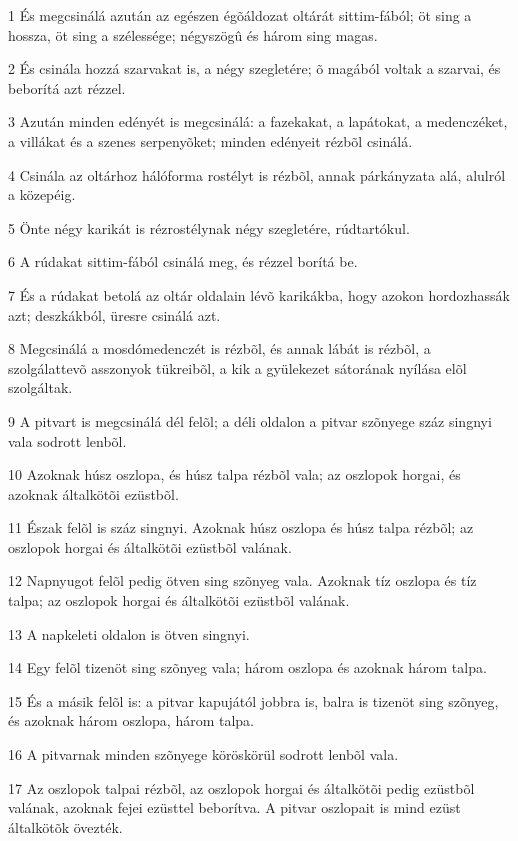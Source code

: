 \par 1 És megcsinálá azután az egészen égõáldozat oltárát sittim-fából; öt sing a hossza, öt sing a szélessége; négyszögû és három sing magas.
\par 2 És csinála hozzá szarvakat is, a négy szegletére; õ magából voltak a szarvai, és beborítá azt rézzel.
\par 3 Azután minden edényét is megcsinálá: a fazekakat, a lapátokat, a medenczéket, a villákat és a szenes serpenyõket; minden edényeit rézbõl csinálá.
\par 4 Csinála az oltárhoz hálóforma rostélyt is rézbõl, annak párkányzata alá, alulról a közepéig.
\par 5 Önte négy karikát is rézrostélynak négy szegletére, rúdtartókul.
\par 6 A rúdakat sittim-fából csinálá meg, és rézzel borítá be.
\par 7 És a rúdakat betolá az oltár oldalain lévõ karikákba, hogy azokon hordozhassák azt; deszkákból, üresre csinálá azt.
\par 8 Megcsinálá a mosdómedenczét is rézbõl, és annak lábát is rézbõl, a szolgálattevõ asszonyok tükreibõl, a kik a gyülekezet sátorának nyílása elõl szolgáltak.
\par 9 A pitvart is megcsinálá dél felõl; a déli oldalon a pitvar szõnyege száz singnyi vala sodrott lenbõl.
\par 10 Azoknak húsz oszlopa, és húsz talpa rézbõl vala; az oszlopok horgai, és azoknak általkötõi ezüstbõl.
\par 11 Észak felõl is száz singnyi. Azoknak húsz oszlopa és húsz talpa rézbõl; az oszlopok horgai és általkötõi ezüstbõl valának.
\par 12 Napnyugot felõl pedig ötven sing szõnyeg vala. Azoknak tíz oszlopa és tíz talpa; az oszlopok horgai és általkötõi ezüstbõl valának.
\par 13 A napkeleti oldalon is ötven singnyi.
\par 14 Egy felõl tizenöt sing szõnyeg vala; három oszlopa és azoknak három talpa.
\par 15 És a másik felõl is: a pitvar kapujától jobbra is, balra is tizenöt sing szõnyeg, és azoknak három oszlopa, három talpa.
\par 16 A pitvarnak minden szõnyege köröskörül sodrott lenbõl vala.
\par 17 Az oszlopok talpai rézbõl, az oszlopok horgai és általkötõi pedig ezüstbõl valának, azoknak fejei ezüsttel beborítva. A pitvar oszlopait is mind ezüst általkötõk övezték.
